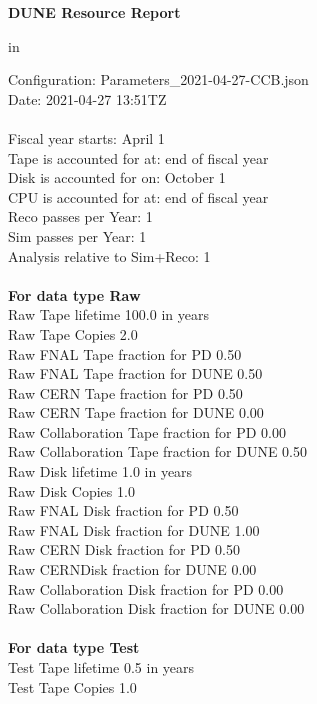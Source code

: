 \documentclass[12pt]{article}
\begin{document}
\parindent=0pt
\setlength{\textwidth=7.0 in}
\setlength{\oddsidemargin=0.00 in}
\setlength{\topmargin=0 in}
\setlength{\textheight=9.5 in}
\centerline{\bf{DUNE Resource Report}} in \par Configuration: Parameters\_2021-04-27-CCB.json\\  Date: 2021-04-27 13:51TZ\\   \\  Fiscal year starts: April 1\\ 
Tape is accounted for at: end of fiscal year\\ 
Disk is accounted for on: October 1\\ 
CPU is accounted for at: end of fiscal year\\ 
Reco passes per Year: 1\\
Sim passes per Year: 1\\
Analysis relative to Sim+Reco: 1\\
\pagebreak
\\
{\bf For data type Raw}\\
   Raw Tape lifetime 100.0 in years\\
   Raw Tape Copies   2.0\\
   Raw FNAL Tape fraction for PD  0.50\\
   Raw FNAL Tape fraction for DUNE  0.50\\
   Raw CERN Tape fraction for PD  0.50\\
   Raw CERN Tape fraction for DUNE  0.00\\
   Raw Collaboration Tape fraction for PD  0.00\\
   Raw Collaboration Tape fraction for DUNE  0.50\\
   Raw Disk lifetime   1.0 in years\\
   Raw Disk Copies   1.0\\
   Raw FNAL Disk fraction for PD  0.50\\
   Raw FNAL Disk fraction for DUNE  1.00\\
   Raw CERN Disk fraction for PD  0.50\\
   Raw CERNDisk fraction for DUNE  0.00\\
   Raw Collaboration Disk fraction for PD  0.00\\
   Raw Collaboration Disk fraction for DUNE  0.00\\
\\
{\bf For data type Test}\\
  Test Tape lifetime   0.5 in years\\
  Test Tape Copies   1.0\\
\end{document}

